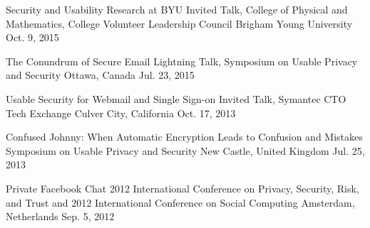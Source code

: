 \begin{presentations}
	\presentation
		{Security and Usability Research at BYU}
		{Invited Talk, College of Physical and Mathematics, College Volunteer Leadership Council}
		{Brigham Young University}
		{Oct. 9, 2015}
		
	\presentation
		{The Conundrum of Secure Email}
		{Lightning Talk,  Symposium on Usable Privacy and Security}
		{Ottawa, Canada}
		{Jul. 23, 2015}
		
	\presentation
		{Usable Security for Webmail and Single Sign-on}
		{Invited Talk, Symantec CTO Tech Exchange}
		{Culver City, California}
		{Oct. 17, 2013}
		
	\presentation
		{Confused Johnny: When Automatic Encryption Leads to Confusion and Mistakes}
		{ Symposium on Usable Privacy and Security}
		{New Castle, United Kingdom}
		{Jul. 25, 2013}
		
	\presentation
		{Private Facebook Chat}
		{2012 International Conference on Privacy, Security, Risk, and Trust and 2012 International Conference on Social Computing}
		{Amsterdam, Netherlands}
		{Sep. 5, 2012}
\end{presentations}
